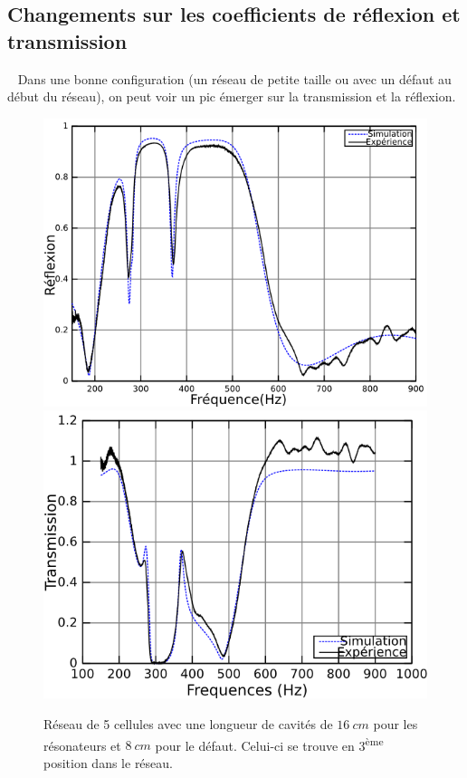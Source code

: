 \documentclass[12pt,notes=show]{beamer} %
\begin{document}
\subsection{Changements sur les coefficients de réflexion et transmission}
\begin{frame}{~}
Dans une bonne configuration (un réseau de petite taille ou avec un défaut au début du réseau), on peut voir un pic émerger sur la transmission et la réflexion.


\begin{figure}
\centering
\includegraphics[scale=0.2]{R_5HR165_8cm_pos3.png}\hfill
\includegraphics[scale=0.2]{T_5HR165_8cm_pos3.png}
\caption{ {\small Réseau de 5 cellules avec une longueur de cavités de $16~cm$ pour les résonateurs et $8~cm$ pour le défaut. Celui-ci se trouve en 3\textsuperscript{ème} position dans le réseau.}}
\end{figure}

\end{frame}
\end{document}
